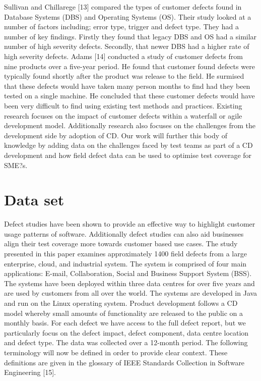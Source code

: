 \documentclass[conference]{IEEEtran}
\begin{document}
Sullivan and Chillarege [13] compared the types of customer defects found in Database Systems (DBS) and Operating Systems (OS). Their study looked at a number of factors including; error type, trigger and defect type. They had a number of key findings. Firstly they found that legacy DBS and OS had a similar number of high severity defects. Secondly, that newer DBS had a higher rate of high severity defects. 
Adams [14] conducted a study of customer defects from nine products over a five-year period. He found that customer found defects were typically found shortly after the product was release to the field. He surmised that these defects would have taken many person months to find had they been tested on a single machine. He concluded that these customer defects would have been very difficult to find using existing test methods and practices.
Existing research focuses on the impact of customer defects within a waterfall or agile development model. Additionally research also focuses on the challenges from the development side by adoption of CD. Our work will further this body of knowledge by adding data on the challenges faced by test teams as part of a CD development and how field defect data can be used to optimise test coverage for SME?s.

\section{Data set}

Defect studies have been shown to provide an effective way to highlight customer usage patterns of software. Additionally defect studies can also aid businesses align their test coverage more towards customer based use cases.
The study presented in this paper examines approximately 1400 field defects from a large enterprise, cloud, and industrial system. The system is comprised of four main applications: E-mail, Collaboration, Social and Business Support System (BSS). The systems have been deployed within three data centres for over five years and are used by customers from all over the world. The systems are developed in Java and run on the Linux operating system. Product development follows a CD model whereby small amounts of functionality are released to the public on a monthly basis.  For each defect we have access to the full defect report, but we particularly focus on the defect impact, defect component, data centre location and defect type. The data was collected over a 12-month period.
The following terminology will now be defined in order to provide clear context. These definitions are given in the glossary of IEEE Standards Collection in Software Engineering [15]. 
\end{document}
